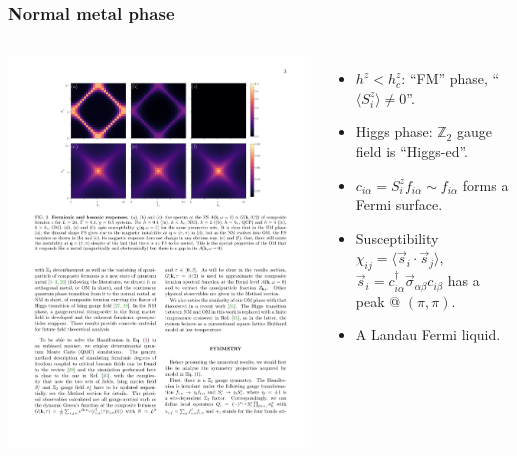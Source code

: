 \documentclass[xcolor=table, 10pt, aspectratio=43]{beamer}
\begin{document}
\begin{frame}
\frametitle{Normal metal phase}
\begin{columns}
\includegraphics[width=\columnwidth]{../orthogonal_metal/nm}
\begin{itemize}
\item $h^z < h_c^z$: ``FM'' phase, ``$\langle S_i^z\rangle\neq0$''.
\item Higgs phase: $\mathbb Z_2$ gauge field is ``Higgs-ed''.
\item $c_{i\alpha} = S_i^zf_{i\alpha}\sim f_{i\alpha}$ forms a Fermi surface.
\item Susceptibility
$\chi_{ij}=\langle \vec s_i\cdot\vec s_j\rangle$,
$\vec s_i=c_{i\alpha}^\dagger\vec\sigma_{\alpha\beta}c_{i\beta}$ has a peak @ $(\pi,\pi)$.
\item A Landau Fermi liquid.
\end{itemize}
\end{columns}
\end{frame}
\end{document}
